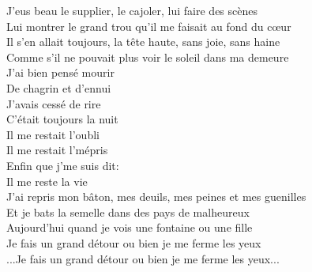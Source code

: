 \documentclass{novel}
\begin{document}
\begin{multicols}{2}
J'eus beau le supplier, le cajoler, lui faire des scènes \\
Lui montrer le grand trou qu'il me faisait au fond du cœur \\
Il s'en allait toujours, la tête haute, sans joie, sans haine \\
Comme s'il ne pouvait plus voir le soleil dans ma demeure \\

J'ai bien pensé mourir \\
De chagrin et d'ennui \\
J'avais cessé de rire \\
C'était toujours la nuit \\
Il me restait l'oubli \\
Il me restait l'mépris \\
Enfin que j'me suis dit: \\
Il me reste la vie \\

J'ai repris mon bâton, mes deuils, mes peines et mes guenilles \\
Et je bats la semelle dans des pays de malheureux \\
Aujourd'hui quand je vois une fontaine ou une fille \\
Je fais un grand détour ou bien je me ferme les yeux \\
...Je fais un grand détour ou bien je me ferme les yeux... \\

\end{multicols}
\end{document}
